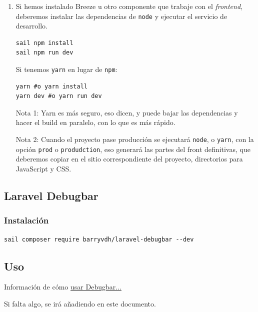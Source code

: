 \documentclass[11pt]{article}
\begin{document}
\begin{enumerate}
\begin{enumerate}
\begin{verbatim}
sail artisan migrate:fresh --seed
\end{verbatim}
Normalmente \emph{fresh} no sería necesario en este caso, pero por
si las moscas.
\item Si hemos instalado Breeze u otro componente que trabaje con
el \emph{frontend}, deberemos instalar las dependencias de \texttt{node}
y ejecutar el servicio de desarrollo.
\begin{verbatim}
sail npm install
sail npm run dev
\end{verbatim}
Si tenemos \texttt{yarn} en lugar de \texttt{npm}:
\begin{verbatim}
yarn #o yarn install
yarn dev #o yarn run dev
\end{verbatim}
Nota 1:
Yarn es más seguro, eso dicen, y puede bajar las dependencias
y hacer el build en paralelo, con lo que es más rápido.

Nota 2:
Cuando el proyecto pase producción se ejecutará \texttt{node}, o \texttt{yarn},
con la opción \texttt{prod} o \texttt{produdction}, eso generará las partes
del front definitivas, que deberemos copiar en el sitio
correspondiente del proyecto, directorios para JavaScript y CSS.
\end{enumerate}
\end{enumerate}


\subsection{Laravel Debugbar}
\label{sec:org9b44064}
\subsubsection{Instalación}
\label{sec:org563c5e5}
\begin{verbatim}
sail composer require barryvdh/laravel-debugbar --dev
\end{verbatim}

\subsection{Uso}
\label{sec:org802f195}

Información de cómo \href{https://github.com/barryvdh/laravel-debugbar}{usar Debugbar...}

Si falta algo, se irá añadiendo en este documento.
\end{document}

